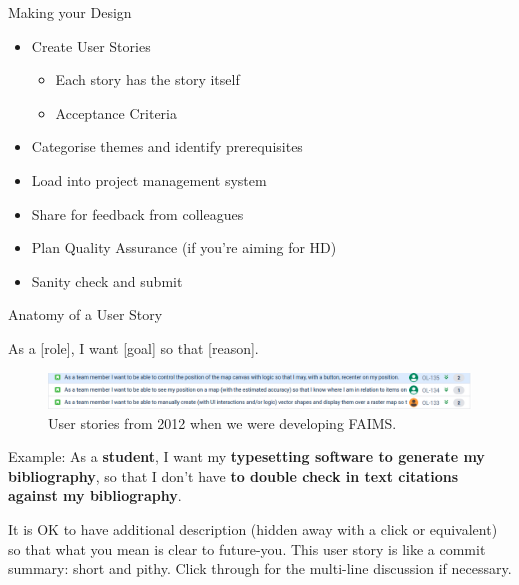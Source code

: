 \documentclass[aspectratio=1610, 11pt]{beamer} %
\begin{document}
\begin{frame}{Making your Design}

\begin{itemize}[label=\textbullet]
    \item Create User Stories
    \begin{itemize}[label=\textbullet]
        \item Each story has the story itself
        \item Acceptance Criteria
    \end{itemize}
    \item Categorise themes and identify prerequisites
    \item Load into project management system
    \item Share for feedback from colleagues
    \item Plan Quality Assurance (if you're aiming for HD)
    \item Sanity check and submit
\end{itemize}
    
\end{frame}

\begin{frame}{Anatomy of a User Story}

{\huge As a [role], I want [goal] so that [reason].}

\begin{figure}
    \centering
    \includegraphics[width=\textwidth]{figures/userstories.png}
    \caption{User stories from 2012 when we were developing FAIMS.}
    \label{fig:userstory}
\end{figure}

Example: As a \textbf{student}, I want my \textbf{typesetting software to generate my bibliography}, so that I don’t have \textbf{to double check in text citations against my bibliography}.

It is OK to have additional description (hidden away with a click or equivalent) so that what you mean is clear to future-you. This user story is like a commit summary: short and pithy. Click through for the multi-line discussion if necessary.
\end{frame}
\end{document}
